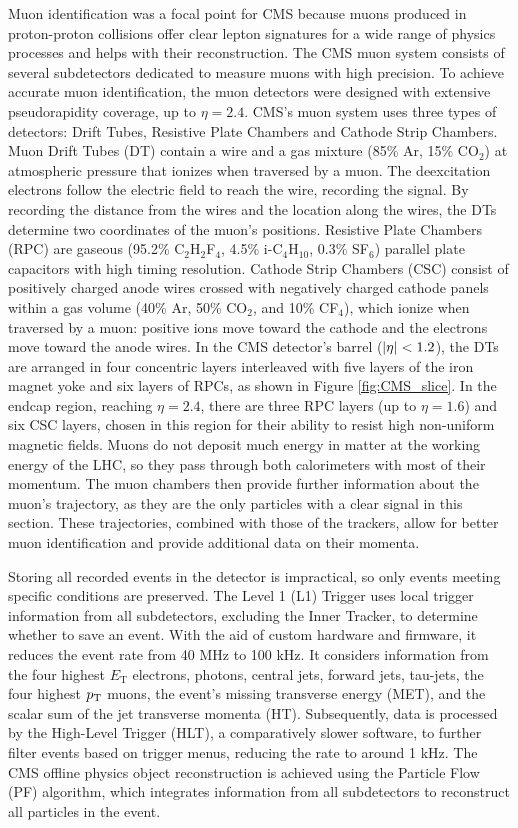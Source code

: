 Muon identification was a focal point for CMS because muons produced in proton-proton collisions offer clear lepton signatures for a wide range of physics processes and helps with their reconstruction. The CMS muon system consists of several subdetectors dedicated to measure muons with high precision. To achieve accurate muon identification, the muon detectors were designed with extensive pseudorapidity coverage, up to $\eta = 2.4$. CMS's muon system uses three types of detectors: Drift Tubes, Resistive Plate Chambers and Cathode Strip Chambers. Muon Drift Tubes (DT) contain a wire and a gas mixture (85\% Ar, 15\% CO$_2$) at atmospheric pressure that ionizes when traversed by a muon. The deexcitation electrons follow the electric field to reach the wire, recording the signal. By recording the distance from the wires and the location along the wires, the DTs determine two coordinates of the muon's positions. Resistive Plate Chambers (RPC) are gaseous (95.2\% C$_2$H$_2$F$_4$, 4.5\% i-C$_4$H$_{10}$, 0.3\% SF$_6$) parallel plate capacitors with high timing resolution. Cathode Strip Chambers (CSC) consist of positively charged anode wires crossed with negatively charged cathode panels within a gas volume (40\% Ar, 50\% CO$_2$, and 10\% CF$_4$), which ionize when traversed by a muon: positive ions move toward the cathode and the electrons move toward the anode wires. In the CMS detector's barrel ($\left\lvert\eta\right\rvert < 1.2$), the DTs are arranged in four concentric layers interleaved with five layers of the iron magnet yoke and six layers of RPCs, as shown in Figure \ref{fig:CMS_slice}. In the endcap region, reaching $\eta = 2.4$, there are three RPC layers (up to $\eta = 1.6$) and six CSC layers, chosen in this region for their ability to resist high non-uniform magnetic fields. Muons do not deposit much energy in matter at the working energy of the LHC, so they pass through both calorimeters with most of their momentum. The muon chambers then provide further information about the muon's trajectory, as they are the only particles with a clear signal in this section. These trajectories, combined with those of the trackers, allow for better muon identification and provide additional data on their momenta.

Storing all recorded events in the detector is impractical, so only events meeting specific conditions are preserved. The Level 1 (L1) Trigger uses local trigger information from all subdetectors, excluding the Inner Tracker, to determine whether to save an event. With the aid of custom hardware and firmware, it reduces the event rate from 40 MHz to 100 kHz. It considers information from the four highest $E_\text{T}$ electrons, photons, central jets, forward jets, tau-jets, the four highest $p_\text{T}$ muons, the event's missing transverse energy (MET), and the scalar sum of the jet transverse momenta (HT). Subsequently, data is processed by the High-Level Trigger (HLT), a comparatively slower software, to further filter events based on trigger menus, reducing the rate to around 1 kHz. The CMS offline physics object reconstruction is achieved using the Particle Flow (PF) algorithm, which integrates information from all subdetectors to reconstruct all particles in the event.

